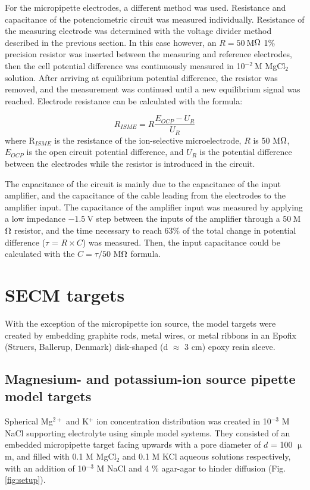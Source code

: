 For the micropipette electrodes, a different method was used.
Resistance and capacitance of the potenciometric circuit was measured individually.
Resistance of the measuring electrode was determined with the voltage divider method described in the previous section.
In this case however, an $R = 50~$M$\ohm$ 1\% precision resistor was inserted between the measuring and reference electrodes, then the cell potential difference was continuously measured in 10$^{-2}~$M MgCl$_2$ solution.
After arriving at equilibrium potential difference, the resistor was removed, and the measurement was continued until a new equilibrium signal was reached.
Electrode resistance can be calculated with the formula:

\begin{equation}
\label{eq:divider}
        R_{ISME}
        =
        R
        \frac
                {E_{OCP} - U_{R}}
                {U_{R}}
\end{equation}
where R$_{ISME}$ is the resistance of the ion-selective microelectrode, $R$ is 50 M$\ohm$, $E_{OCP}$ is the open circuit potential difference, and $U_{R}$ is the potential difference between the electrodes while the resistor is introduced in the circuit.

The capacitance of the circuit is mainly due to the capacitance of the input amplifier, and the capacitance of the cable leading from the electrodes to the amplifier input.
The capacitance of the amplifier input was measured by applying a low impedance $-1.5~$V step between the inputs of the amplifier through a $50~$M$\ohm$ resistor, and the time necessary to reach 63\% of the total change in potential difference ($\tau$ = $R\times C$) was measured.
Then, the input capacitance could be calculated with the $C = \tau/50$ M$\ohm$ formula.
		
	\section{SECM targets}
With the exception of the micropipette ion source, the model targets were created by embedding graphite rods, metal wires, or metal ribbons in an Epofix (Struers, Ballerup, Denmark) disk-shaped (d $\approx$ 3 cm) epoxy resin sleeve.
 
	\subsection{Magnesium- and potassium-ion source pipette model targets}
Spherical Mg$^{2+}$ and K$^+$ ion concentration distribution was created in 10$^{-3}$ M NaCl supporting electrolyte using simple model systems.
They consisted of an embedded micropipette target facing upwards with a pore diameter of $d$ = 100 $\upmu$m, and filled with 0.1 M MgCl$_2$ and 0.1 M KCl aqueous solutions respectively, with an addition of 10$^{-3}$ M NaCl and 4 \% agar-agar to hinder diffusion (Fig. \ref{fig:setup}).

